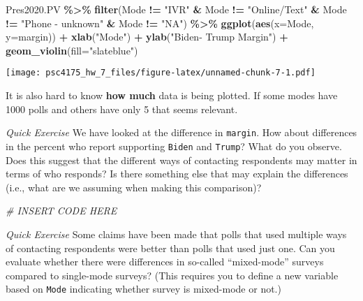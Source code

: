 \documentclass[
]{article}
\newenvironment{Shaded}{\begin{snugshade}}{\end{snugshade}}
\newcommand{\AttributeTok}[1]{\textcolor[rgb]{0.13,0.29,0.53}{#1}}
\newcommand{\CommentTok}[1]{\textcolor[rgb]{0.56,0.35,0.01}{\textit{#1}}}
\newcommand{\FunctionTok}[1]{\textcolor[rgb]{0.13,0.29,0.53}{\textbf{#1}}}
\newcommand{\NormalTok}[1]{#1}
\newcommand{\SpecialCharTok}[1]{\textcolor[rgb]{0.81,0.36,0.00}{\textbf{#1}}}
\newcommand{\StringTok}[1]{\textcolor[rgb]{0.31,0.60,0.02}{#1}}
\begin{document}
\begin{Shaded}
\begin{Highlighting}[]
\NormalTok{Pres2020.PV }\SpecialCharTok{\%\textgreater{}\%} 
  \FunctionTok{filter}\NormalTok{(Mode }\SpecialCharTok{!=} \StringTok{"IVR"} \SpecialCharTok{\&}\NormalTok{ Mode }\SpecialCharTok{!=} \StringTok{"Online/Text"} \SpecialCharTok{\&}\NormalTok{ Mode }\SpecialCharTok{!=} \StringTok{"Phone {-} unknown"} \SpecialCharTok{\&}\NormalTok{ Mode }\SpecialCharTok{!=} \StringTok{"NA"}\NormalTok{) }\SpecialCharTok{\%\textgreater{}\%}
  \FunctionTok{ggplot}\NormalTok{(}\FunctionTok{aes}\NormalTok{(}\AttributeTok{x=}\NormalTok{Mode, }\AttributeTok{y=}\NormalTok{margin)) }\SpecialCharTok{+} 
    \FunctionTok{xlab}\NormalTok{(}\StringTok{"Mode"}\NormalTok{) }\SpecialCharTok{+} 
    \FunctionTok{ylab}\NormalTok{(}\StringTok{"Biden{-} Trump Margin"}\NormalTok{) }\SpecialCharTok{+}
    \FunctionTok{geom\_violin}\NormalTok{(}\AttributeTok{fill=}\StringTok{"slateblue"}\NormalTok{)}
\end{Highlighting}
\end{Shaded}

\texttt{[image: psc4175\_hw\_7\_files/figure-latex/unnamed-chunk-7-1.pdf]}

It is also hard to know \textbf{how much} data is being plotted. If some
modes have 1000 polls and others have only 5 that seems relevant.

\emph{Quick Exercise} We have looked at the difference in
\texttt{margin}. How about differences in the percent who report
supporting \texttt{Biden} and \texttt{Trump}? What do you observe. Does
this suggest that the different ways of contacting respondents may
matter in terms of who responds? Is there something else that may
explain the differences (i.e., what are we assuming when making this
comparison)?

\begin{Shaded}
\begin{Highlighting}[]
\CommentTok{\# INSERT CODE HERE}
\end{Highlighting}
\end{Shaded}

\emph{Quick Exercise} Some claims have been made that polls that used
multiple ways of contacting respondents were better than polls that used
just one. Can you evaluate whether there were differences in so-called
``mixed-mode'' surveys compared to single-mode surveys? (This requires
you to define a new variable based on \texttt{Mode} indicating whether
survey is mixed-mode or not.)
\end{document}
